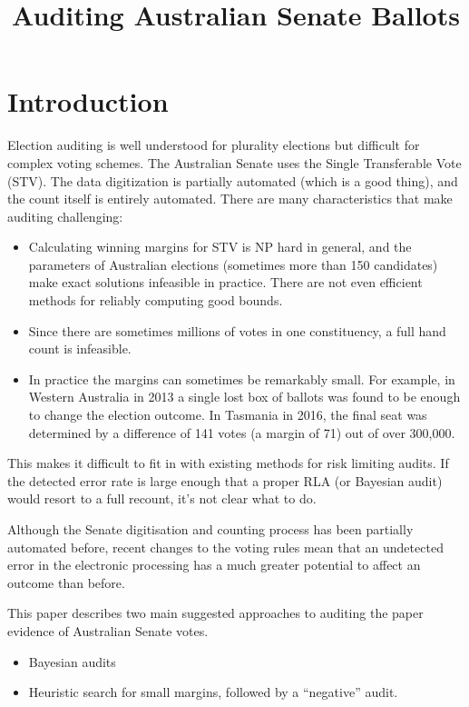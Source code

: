 \documentclass[10pt,a4paper]{article}
\begin{document}
\title{Auditing Australian Senate Ballots}
\maketitle

\tableofcontents

\section{Introduction}
Election auditing is well understood for plurality elections but difficult for complex voting schemes.  The Australian Senate uses the Single Transferable Vote (STV).  The data digitization is partially automated (which is a good thing), and the count itself is entirely automated.  There are many characteristics that make auditing challenging:

\begin{itemize}
\item Calculating winning margins for STV is NP hard in general, and the parameters of Australian elections (sometimes more than 150 candidates) make exact solutions infeasible in practice.  There are not even efficient methods for reliably computing good bounds. 	
\item Since there are sometimes millions of votes in one constituency, a full hand count is infeasible.
\item In practice the margins can sometimes be remarkably small.  For example, in Western Australia in 2013 a single lost box of ballots was found to be enough to change the election outcome.  In Tasmania in 2016, the final seat was determined by a difference of 141 votes 
(a margin of 71) out of over 300,000.	
\end{itemize}

This makes it difficult to fit in with existing methods for risk limiting audits. If the detected error rate is large enough
that a proper RLA (or Bayesian audit) would resort to a full recount, it's not clear what to do.  

Although the Senate digitisation and counting process has been partially automated before, recent changes to the voting rules mean that an undetected error in the electronic processing has a much greater potential to affect an outcome than before.

This paper describes two main suggested approaches to auditing the paper evidence of Australian Senate votes.  
\begin{itemize}
	\item Bayesian audits~\cite{rivest2012bayesian} 
	\item Heuristic search for small margins, followed by a ``negative'' audit.
\end{itemize}
\end{document}
